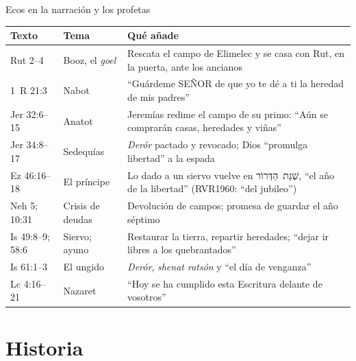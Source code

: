 \documentclass[hyperref={bookmarks=false},aspectratio=169]{beamer}
\newcommand{\heb}[1]{\mbox{\foreignlanguage{hebrew}{#1}}}
\newcommand{\SENOR}{S{\fontsize{0.78em}{1em}\selectfont EÑOR}}
\begin{document}
\begin{frame}{Ecos en la narración y los profetas}
\fontsize{6.6}{7.8}\selectfont\renewcommand{\arraystretch}{1.12}
\begin{tabular}{@{}L{1.9cm}L{2.5cm}L{7.6cm}@{}}
\toprule
\textbf{Texto} & \textbf{Tema} & \textbf{Qué añade} \\ \midrule
Rut 2--4 & Booz, el \emph{goel} & Rescata el campo de Elimelec y se casa con Rut, en la puerta, ante los ancianos \\
1~R 21:3 & Nabot & ``Guárdeme \SENOR{} de que yo te dé a ti la heredad de mis padres'' \\
Jer 32:6--15 & Anatot & Jeremías redime el campo de su primo: ``Aún se comprarán casas, heredades y viñas'' \\
Jer 34:8--17 & Sedequías & \emph{Derór} pactado y revocado; Dios ``promulga libertad'' a la espada \\
Ez 46:16--18 & El príncipe & Lo dado a un siervo vuelve en \heb{שְׁנַת הַדְּרוֹר}, ``el año de la libertad'' (RVR1960: ``del jubileo'') \\
Neh 5; 10:31 & Crisis de deudas & Devolución de campos; promesa de guardar el año séptimo \\
Is 49:8--9; 58:6 & Siervo; ayuno & Restaurar la tierra, repartir heredades; ``dejar ir libres a los quebrantados'' \\
Is 61:1--3 & El ungido & \emph{Derór}, \emph{shenat ratsón} y ``el día de venganza'' \\
Lc 4:16--21 & Nazaret & ``Hoy se ha cumplido esta Escritura delante de vosotros'' \\
\bottomrule
\end{tabular}
\end{frame}

\section{Historia}
\end{document}
